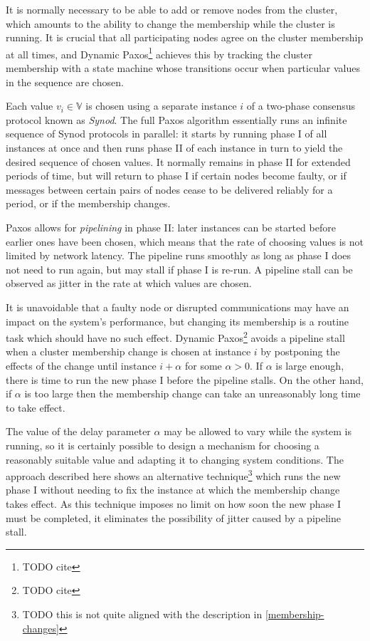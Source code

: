 \documentclass[journal]{IEEEtran}
\begin{document}
It is normally necessary to be able to add or remove nodes from the cluster,
which amounts to the ability to change the membership while the cluster is
running. It is crucial that all participating nodes agree on the cluster
membership at all times, and Dynamic Paxos\footnote{TODO cite} achieves this by
tracking the cluster membership with a state machine whose transitions occur
when particular values in the sequence are chosen.

Each value $v_i \in \mathbb V$ is chosen using a separate instance $i$ of a
two-phase consensus protocol known as \textit{Synod}. The full Paxos algorithm
essentially runs an infinite sequence of Synod protocols in parallel: it starts
by running phase I of all instances at once and then runs phase II of each
instance in turn to yield the desired sequence of chosen values. It normally
remains in phase II for extended periods of time, but will return to phase I if
certain nodes become faulty, or if messages between certain pairs of nodes
cease to be delivered reliably for a period, or if the membership changes.

Paxos allows for \textit{pipelining} in phase II: later instances can be
started before earlier ones have been chosen, which means that the rate of
choosing values is not limited by network latency. The pipeline runs smoothly
as long as phase I does not need to run again, but may stall if phase I is
re-run. A pipeline stall can be observed as jitter in the rate at which values
are chosen.

It is unavoidable that a faulty node or disrupted communications may have an
impact on the system's performance, but changing its membership is a routine
task which should have no such effect. Dynamic Paxos\footnote{TODO cite} avoids
a pipeline stall when a cluster membership change is chosen at instance $i$ by
postponing the effects of the change until instance $i + \alpha$ for some
$\alpha > 0$. If $\alpha$ is large enough, there is time to run the new phase I
before the pipeline stalls.  On the other hand, if $\alpha$ is too large then
the membership change can take an unreasonably long time to take effect.

The value of the delay parameter $\alpha$ may be allowed to vary while the
system is running, so it is certainly possible to design a mechanism for
choosing a reasonably suitable value and adapting it to changing system
conditions. The approach described here shows an alternative
technique\footnote{TODO this is not quite aligned with the description in
\ref{membership-changes}} which runs the new phase I without needing to fix the
instance at which the membership change takes effect. As this technique imposes
no limit on how soon the new phase I must be completed, it eliminates the
possibility of jitter caused by a pipeline stall.
\end{document}
